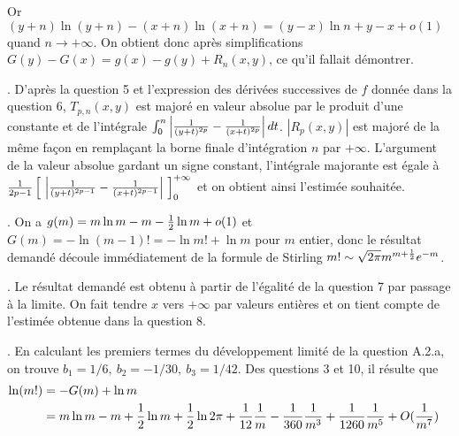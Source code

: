 {\begin{enumerate}
{Or $(y+n)\ln(y+n) - (x+n)\ln(x+n) = (y-x)\ln n + y - x + o(1)$
quand $n\to +\infty$. On obtient donc après simplifications
$G(y)-G(x)=g(x)-g(y)+R_n(x,y)$, ce qu'il fallait démontrer.

. D'après la question 5 et l'expression des dérivées successives de $f$ donnée dans
la question 6, $T_{p,n}(x,y)$ est majoré en valeur absolue par le produit d'une constante
et de l'intégrale
$\int_0^n \left| {1\over (y+t)^{2p}} - {1\over (x+t)^{2p}} \right| dt$.
$|R_p(x,y)|$ est majoré de la m{\^e}me façon en remplaçant la borne finale d'intégration
$n$ par $+\infty$. L'argument de la valeur absolue gardant un signe constant, l'intégrale
majorante est égale à
${1\over 2p-1} \left[ \ \left| {1\over (y+t)^{2p-1}}
                                - {1\over (x+t)^{2p-1}} \right| \ \right]_0^{+\infty}$
et on obtient ainsi l'estimée souhaitée.


. On a $g(m)=m\ln m - m - {1\over2}\ln m + o(1)$ et $G(m)=-\ln(m-1)!=-\ln m! + \ln m$ pour
$m$ entier, donc
le résultat demandé découle immédiatement de la formule de Stirling
$m! \sim \sqrt{2\pi} m^{m+{1\over2}} e^{-m}$.

. Le résultat demandé est obtenu à partir de l'égalité de la question 7 par passage à la
limite. On fait tendre $x$ vers $+\infty$ par valeurs entières et on tient compte de l'estimée
obtenue dans la question 8.

. En calculant les premiers termes du développement limité de la question A.2.a,
on trouve $b_1=1/6,\ b_2=-1/30,\ b_3=1/42$.
Des questions 3 et 10, il résulte que
$$\begin{aligned}
\ln(m!) &= -G(m) + \ln m        \cr
        &= m\ln m - m + {1\over2}\ln m + {1\over2}\ln2\pi
        + {1\over12} {1\over m} - {1\over360} {1\over m^3} + {1\over1260} {1\over m^5}
        + O({1\over m^7})  \cr
\end{aligned}
$$
}
\end{enumerate}
}
